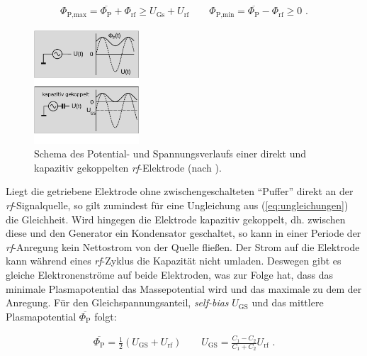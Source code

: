 \documentclass[numbers=noenddot,a4paper,notitlepage,twoside,BCOR15mm]{scrbook}
\newcommand{\ix}[1]{_\text{#1}}
\newcommand{\tilt}[1]{\textit{#1}}
\begin{document}
						\begin{align}
							\Phi\ix{P,max}=\overline{\Phi\ix{P}}+\Phi\ix{rf}\geq U\ix{Gs}+U\ix{rf} \quad \quad \Phi\ix{P,min}=\overline{\Phi\ix{P}}-\Phi\ix{rf}\geq 0\, \, . \label{eq:ungleichungen}
						\end{align}

						\begin{figure}
							\centering
							\vspace{-0.5cm}
							\includegraphics[width=0.35\textwidth,height=0.35\textwidth]{figs/kapazitivekopplungohneschemapiel.png}
							\caption{ Schema des Potential- und Spannungsverlaufs einer direkt und kapazitiv gekoppelten \tilt{rf}-Elektrode (nach \cite{Piel10}).}
							\label{img:kapazitivgekoppelt}
						\end{figure}

					Liegt die getriebene Elektrode ohne zwischengeschalteten ``Puffer'' direkt an der \tilt{rf}-Signalquelle, so gilt zumindest f\"ur eine Ungleichung aus (\ref{eq:ungleichungen}) die Gleichheit. Wird hingegen die Elektrode kapazitiv gekoppelt, dh. zwischen diese und den Generator ein Kondensator geschaltet, so kann in einer Periode der \tilt{rf}-Anregung kein Nettostrom von der Quelle flie{\ss}en. Der Strom auf die Elektrode kann während eines \tilt{rf}-Zyklus die Kapazität nicht umladen. Deswegen gibt es gleiche Elektronenstr\"ome auf beide Elektroden, was zur Folge hat, dass das minimale Plasmapotential das Massepotential wird und das maximale zu dem der Anregung. F\"ur den Gleichspannungsanteil, \tilt{self-bias} $U\ix{GS}$ und das mittlere Plasmapotential $\overline{\Phi\ix{P}}$ folgt:

						\begin{align}
							\overline{\Phi\ix{P}}=\frac{1}{2}\left(U\ix{GS}+U\ix{rf}\right) \quad \quad U\ix{GS}=\frac{C\ix{1}-C\ix{2}}{C\ix{1}+C\ix{2}}U\ix{rf} \,\, .\label{eq:selfbiaszwei} 
						\end{align}
\end{document}

